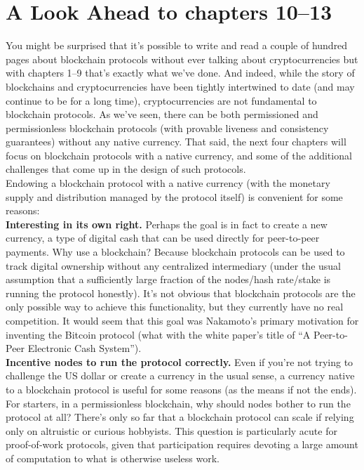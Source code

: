 \section{A Look Ahead to chapters 10–13}
You might be surprised that it’s possible to write and read a couple of hundred pages about
blockchain protocols without ever talking about cryptocurrencies but with chapters 1–9
that’s exactly what we've done. And indeed, while the story of blockchains and cryptocurrencies have been tightly intertwined to date (and may continue to be for a long time),
cryptocurrencies are not fundamental to blockchain protocols. As we've seen, there can
be both permissioned and permissionless blockchain protocols (with provable liveness and
consistency guarantees) without any native currency. That said, the next four chapters will
focus on blockchain protocols with a native currency, and some of the additional challenges
that come up in the design of such protocols.\\
Endowing a blockchain protocol with a native currency (with the monetary supply and
distribution managed by the protocol itself) is convenient for some reasons:\\

\noindent
\textbf{Interesting in its own right.} Perhaps the goal is in fact to create a new currency, 
a type of digital cash that can be used directly for peer-to-peer payments. Why use a
blockchain? Because blockchain protocols can be used to track digital ownership without
any centralized intermediary (under the usual assumption that a sufficiently large fraction of
the nodes/hash rate/stake is running the protocol honestly). It’s not obvious that blockchain
protocols are the only possible way to achieve this functionality, but they currently have
no real competition. It would seem that this goal was Nakamoto’s primary motivation
for inventing the Bitcoin protocol (what with the white paper’s title of “A Peer-to-Peer
Electronic Cash System”).\\

\noindent
\textbf{Incentive nodes to run the protocol correctly.} Even if you’re not trying to challenge
the US dollar or create a currency in the usual sense, a currency native to a blockchain
protocol is useful for some reasons (as the means if not the ends). For starters, in
a permissionless blockchain, why should nodes bother to run the protocol at all? There’s
only so far that a blockchain protocol can scale if relying only on altruistic or curious hobbyists. This question is particularly acute for proof-of-work protocols, given that participation
requires devoting a large amount of computation to what is otherwise useless work.\\

